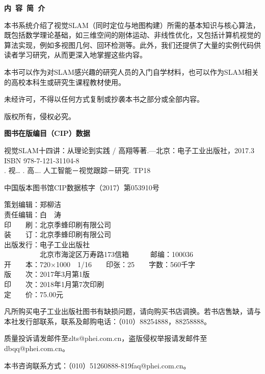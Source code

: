 \pagestyle{empty}
{

{\noindent\hfill\bfseries 内\ 容\ 简\ 介\hfill}

本书系统介绍了视觉SLAM（同时定位与地图构建）所需的基本知识与核心算法，既包括数学理论基础，如三维空间的刚体运动、非线性优化，又包括计算机视觉的算法实现，例如多视图几何、回环检测等。此外，我们还提供了大量的实例代码供读者学习研究，从而更深入地掌握这些内容。

本书可以作为对SLAM感兴趣的研究人员的入门自学材料，也可以作为SLAM相关的高校本科生或研究生课程教材使用。


未经许可，不得以任何方式复制或抄袭本书之部分或全部内容。

版权所有，侵权必究。


\noindent\bfseries 图书在版编目（CIP）数据\normalfont

\noindent{}视觉SLAM十四讲：从理论到实践 / 高翔等著.—北京：电子工业出版社，2017.3\\
ISBN 978-7-121-31104-8\\
\uppercase\expandafter{}. 视… \uppercase\expandafter{}. 高…\uppercase\expandafter{}. 人工智能－视觉跟踪－研究\uppercase\expandafter{}. TP18

\noindent{}中国版本图书馆CIP数据核字（2017）第053910号


\noindent 策划编辑：郑柳洁\\
责任编辑：白　涛\\
印　　刷：北京季蜂印刷有限公司\\
装　　订：北京季蜂印刷有限公司\\
出版发行：电子工业出版社\\
　　　　　北京市海淀区万寿路173信箱　　　邮编：100036\\
开　　本：720×1000　1/16　　印张：25　　字数：560千字\\
版　　次：2017年3月第1版\\
印　　次：2018年1月第7次印刷\\
定　　价：75.00元


凡所购买电子工业出版社图书有缺损问题，请向购买书店调换。若书店售缺，请与本社发行部联系，联系及邮购电话：（010）88254888，88258888。

质量投诉请发邮件至zlts@phei.com.cn，盗版侵权举报请发邮件至dbqq@phei.com.cn。

本书咨询联系方式：（010）51260888-819\quad faq@phei.com.cn。
}

